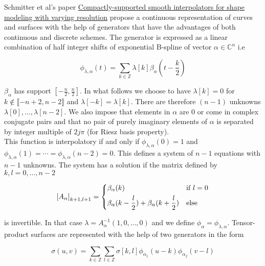 \documentclass[a4paper, 11pt]{article}
\begin{document}
Schmitter et al's paper \underline{Compactly-supported smooth interpolators for shape modeling with varying resolution} 
propose a continuous representation of curves and surfaces with the help of generators that have the advantages of both 
continuous and discrete schemes. The generator is expressed as a linear combination of half integer shifts of 
exponential B-spline of vector $\alpha \in \mathbb{C}^n$  i.e

\begin{equation}
  \phi_{\lambda, \alpha}(t) = \sum_{k \in \mathbb{Z}} \lambda[k] \beta_{\alpha}(t-\frac{k}{2})
\end{equation}

$\beta_{\alpha}$ has support $[-\frac{n}{2}, \frac{n}{2}]$. In what follows we choose to have $\lambda[k]=0$ for $k 
\not\in \llbracket-n+2, n-2\rrbracket$ and $\lambda[-k]=\lambda[k]$. There are therefore $(n-1)$ unknowns $\lambda[0], 
\ldots, \lambda[n-2]$. We also impose that elements in $\alpha$ are 0 or come in complex conjugate pairs and that no 
pair of purely imaginary elements of $\alpha$ is separated by integer multiple of $2j\pi$ (for Riesz basis property). \\

This function is interpolatory if and only if $\phi_{\lambda, \alpha}(0)=1$ and $\phi_{\lambda, 
\alpha}(1)=\cdots=\phi_{\lambda, \alpha}(n-2)=0$. This defines a system of $n-1$ equations with $n-1$ unknowns. The 
system has a solution if the matrix defined by $k,l = 0, \ldots, n-2$

\begin{equation}
  {[A_{\alpha}]}_{k+1, l+1} = \begin{dcases}
    \beta_{\alpha}(k) &\text{if } l=0 \\
    \beta_{\alpha}(k-\frac{l}{2}) + \beta_{\alpha}(k+\frac{l}{2})  &\text{else }      
  \end{dcases}
\end{equation}

is invertible. In that case $\lambda = A_{\alpha}^{-1}(1, 0, \ldots, 0)$ and we define $\phi_{\alpha} = \phi_{\lambda, 
\alpha}$. Tensor-product surfaces are represented with the help of two generators in the form

\begin{equation}
  \sigma(u, v) = \sum_{k \in \mathbb{Z}}\sum_{l \in \mathbb{Z}} \sigma[k,l] \phi_{\alpha_1}(u-k) \phi_{\alpha_2}(v-l)
\end{equation}
\end{document}
